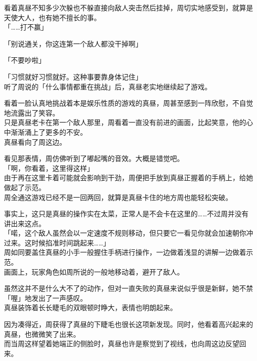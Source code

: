 看着真昼不知多少次躲也不躲直接向敌人突击然后挂掉，周切实地感受到，就算是天使大人，也有她不擅长的事。\\

「……打不赢」

「别说通关，你这连第一个敌人都没干掉啊」

「不要吵啦」

「习惯就好习惯就好。这种事要靠身体记住」\\

听了周说的「什么事情都重在挑战」后，真昼老实地继续起了游戏。

看着一脸认真地挑战着本是娱乐性质的游戏的真昼，周甚至感到一阵欣慰，不自觉地流露出了笑容。\\

只是真昼老卡在第一个敌人那里，周看着一直没有前进的画面，比起笑意，他的心中渐渐涌上了更多的不安。\\

真昼看向了周这边。

看见那表情，周仿佛听到了嘟起嘴的音效。大概是错觉吧。\\

「啊，你看着，这里得这样」\\

由于再在这里卡着可能就会影响到干劲，周便把手放到真昼正握着的手柄上，给她做起了示范。\\

周全通这游戏已经不是一回两回，就算是真昼卡住的地方周也能轻松突破。

事实上，这只是真昼的操作实在太菜，正常人是不会卡在这里的……不过周并没有讲出来这点。\\

「喏，这个敌人虽然会以一定速度不规则移动，但只要它一看见你就会加速朝你冲过来。这时候掐准时间跳起来……」\\

周如同要盖住真昼的小手一般握住手柄进行操作，一边做着浅显的讲解一边做着示范。\\

画面上，玩家角色如周所说的一般地移动着，避开了敌人。

虽然这并不是什么大不了的动作，但对一直失败的真昼来说似乎很是新鲜，她不禁「喔」地发出了一声感叹。\\

真昼装饰着长长睫毛的双眼顿时睁大，表情也明朗起来。

因为凑得近，周获得了真昼的下睫毛也很长这项新发现。同时，他看着高兴起来的真昼，也微微笑了出来。\\

而当周这样望着她端正的侧脸时，真昼也许是察觉到了视线，也向周这边反望回来。\\

